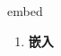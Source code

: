 
\begin{frame}
{\huge embed}
\begin{center}
\begin{enumerate}\Large
  \item \textbf{嵌入}
\end{enumerate}
\end{center}
\end{frame}
